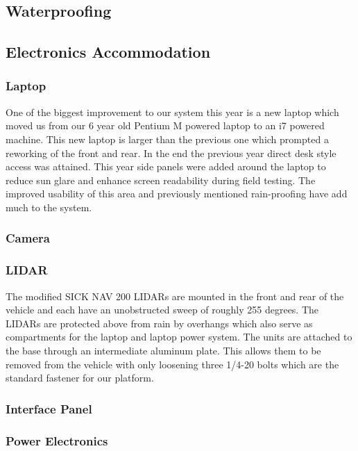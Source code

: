 \subsection{Waterproofing}

\subsection{Electronics Accommodation}
\subsubsection{Laptop}
One of the biggest improvement to our system this year is a new laptop which moved us from our 6 year old Pentium M powered laptop to an i7 powered machine. This new laptop is larger than the previous one which prompted a reworking of the front and rear. In the end the previous year direct desk style access was attained. This year side panels were added around the laptop to reduce sun glare and enhance screen readability during field testing. The improved usability of this area and previously mentioned rain-proofing have add much to the system.

\subsubsection{Camera}

\subsubsection{LIDAR}
The modified SICK NAV 200 LIDARs are mounted in the front and rear of the vehicle and each have an unobstructed sweep of roughly 255 degrees. The LIDARs are protected above from rain by overhangs which also serve as compartments for the laptop and laptop power system. The units are attached to the base through an intermediate aluminum plate. This allows them to be removed from the vehicle with only loosening three 1/4-20 bolts which are the standard fastener for our platform.

\subsubsection{Interface Panel}

\subsubsection{Power Electronics}
